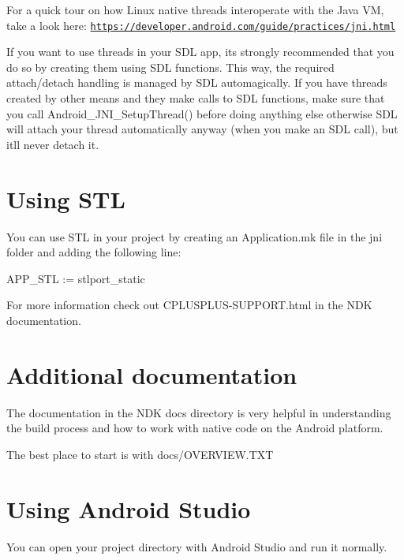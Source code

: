 For a quick tour on how Linux native threads interoperate with the Java VM, take a look here\+: \href{https://developer.android.com/guide/practices/jni.html}{\tt https\+://developer.\+android.\+com/guide/practices/jni.\+html}

If you want to use threads in your S\+DL app, it\textquotesingle{}s strongly recommended that you do so by creating them using S\+DL functions. This way, the required attach/detach handling is managed by S\+DL automagically. If you have threads created by other means and they make calls to S\+DL functions, make sure that you call Android\+\_\+\+J\+N\+I\+\_\+\+Setup\+Thread() before doing anything else otherwise S\+DL will attach your thread automatically anyway (when you make an S\+DL call), but it\textquotesingle{}ll never detach it.



 \section*{Using S\+TL }

You can use S\+TL in your project by creating an Application.\+mk file in the jni folder and adding the following line\+: \begin{DoxyVerb}APP_STL := stlport_static
\end{DoxyVerb}


For more information check out C\+P\+L\+U\+S\+P\+L\+U\+S-\/\+S\+U\+P\+P\+O\+R\+T.\+html in the N\+DK documentation.



 \section*{Additional documentation }

The documentation in the N\+DK docs directory is very helpful in understanding the build process and how to work with native code on the Android platform.

The best place to start is with docs/\+O\+V\+E\+R\+V\+I\+E\+W.\+T\+XT



 \section*{Using Android Studio }

You can open your project directory with Android Studio and run it normally.



